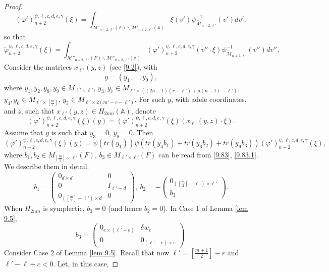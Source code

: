 \documentclass[12pts]{amsart}
\newcommand{\BA}{{\mathbb {A}}}
\begin{document}
\begin{proof}
\begin{equation}\label{9.85}
(\varphi')_{n+2}^{\psi,\ell,c,d,e,\gamma}(\xi)=
\int_{\mathcal{M}'_{n+2,\ell'}(F)\backslash
	\mathcal{M}'_{n+2,\ell'}(\BA)}\xi(v')\psi^{-1}_{\tilde{\mathcal{M}}_{n+2,\ell'}}(v')dv', 
\end{equation}
so that
\begin{equation}\label{9.85.1}
\tilde{\varphi}_{n+2}^{\psi,\ell,c,d,e,\gamma}(\xi)=
\int_{\mathcal{M}''_{n+2,\ell'}(F)\backslash
	\mathcal{M}''_{n+2,\ell'}(\BA)}(\varphi')_{n+2}^{\psi,\ell,c,d,e,\gamma}(v''\cdot \xi)\psi^{-1}_{\tilde{\mathcal{M}}_{n+2,\ell'}}(v'')dv'',
\end{equation}
Consider the matrices $x_{\ell'}(y,z)$ (see \eqref{9.2}), with 
\begin{equation}\label{9.86}
y=(y_1,...,y_9),
\end{equation}
where $y_1,y_2,y_8,y_9\in M_{\ell'\times\ell'}$, $y_3,y_7\in M_{\ell'\times ((2n-1)(r-\ell')+\mu(n-1)-\ell')}$, $y_4, y_6\in M_{\ell'\times [\frac{m}{2}]}$, $y_5\in M_{\ell'\times 2(m'-r-\ell')}$. For such $y$, with adele coordinates, and $z$, such that $x_{\ell'}(y,z)\in H_{2nm}(\BA)$, denote
$$
(\varphi')_{n+2}^{\psi,\ell,c,d,e,\gamma}(\xi)(y)=(\varphi')_{n+2}^{\psi,\ell,c,d,e,\gamma}(\xi)(x_{\ell'}(y,z)\cdot\xi).
$$
Assume that $y$ is such that $y_3=0$, $y_8=0$. Then
\begin{equation}\label{9.87}
(\varphi')_{n+2}^{\psi,\ell,c,d,e,\gamma}(\xi)(y)=\psi(tr(y_1))\psi(tr(y_4b_1)+tr(y_6b_2)+tr(y_9b_3)) (\varphi')_{n+2}^{\psi,\ell,c,d,e,\gamma}(\xi),
\end{equation}
where $b_1, b_2\in M_{[\frac{m}{2}]\times \ell'}(F)$, $b_3\in M_{\ell'\times\ell'}(F)$ can be read from \eqref{9.83}, \eqref{9.83.1}. We describe them in detail. 
$$
b_1=\begin{pmatrix}0_{d\times d}&0\\0&I_{\ell'-d}\\0_{([\frac{m}{2}]-\ell')\times d}&0\end{pmatrix},\ b_2=-\begin{pmatrix}0_{([\frac{m}{2}]-\ell')\times \ell'}\\b_3\end{pmatrix}.
$$
When $H_{2nm}$ is symplectic, $b_3=0$ (and hence $b_2=0$).
In Case 1 of Lemma \ref{lem 9.5},
$$
b_3=\begin{pmatrix}0_{e\times (\ell'-e)}&\delta w_e\\0&0_{(\ell'-e)\times e}\end{pmatrix}.
$$ 
Consider Case 2 of Lemma \ref{lem 9.5}. Recall that now $\ell'=[\frac{m+1}{2}]-r$ and $\ell'-\ell+c<0$. Let, in this case,

\end{proof}
\end{document}

